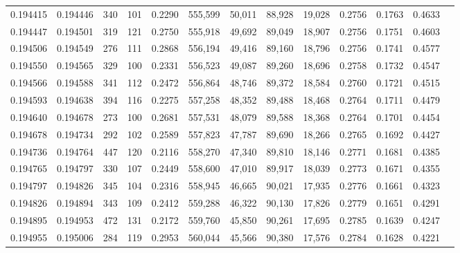 \begin{tabular}{rrrrrrrrrrrrr}
0.194415 & 0.194446 &   340 & 101 &                                     0.2290 & 555,599 &  50,011 &  88,928 &  19,028 & 0.2756 & 0.1763 & 0.4633 \\
0.194447 & 0.194501 &   319 & 121 &                                     0.2750 & 555,918 &  49,692 &  89,049 &  18,907 & 0.2756 & 0.1751 & 0.4603 \\
0.194506 & 0.194549 &   276 & 111 &                                     0.2868 & 556,194 &  49,416 &  89,160 &  18,796 & 0.2756 & 0.1741 & 0.4577 \\
0.194550 & 0.194565 &   329 & 100 &                                     0.2331 & 556,523 &  49,087 &  89,260 &  18,696 & 0.2758 & 0.1732 & 0.4547 \\
0.194566 & 0.194588 &   341 & 112 &                                     0.2472 & 556,864 &  48,746 &  89,372 &  18,584 & 0.2760 & 0.1721 & 0.4515 \\
0.194593 & 0.194638 &   394 & 116 &                                     0.2275 & 557,258 &  48,352 &  89,488 &  18,468 & 0.2764 & 0.1711 & 0.4479 \\
0.194640 & 0.194678 &   273 & 100 &                                     0.2681 & 557,531 &  48,079 &  89,588 &  18,368 & 0.2764 & 0.1701 & 0.4454 \\
0.194678 & 0.194734 &   292 & 102 &                                     0.2589 & 557,823 &  47,787 &  89,690 &  18,266 & 0.2765 & 0.1692 & 0.4427 \\
0.194736 & 0.194764 &   447 & 120 &                                     0.2116 & 558,270 &  47,340 &  89,810 &  18,146 & 0.2771 & 0.1681 & 0.4385 \\
0.194765 & 0.194797 &   330 & 107 &                                     0.2449 & 558,600 &  47,010 &  89,917 &  18,039 & 0.2773 & 0.1671 & 0.4355 \\
0.194797 & 0.194826 &   345 & 104 &                                     0.2316 & 558,945 &  46,665 &  90,021 &  17,935 & 0.2776 & 0.1661 & 0.4323 \\
0.194826 & 0.194894 &   343 & 109 &                                     0.2412 & 559,288 &  46,322 &  90,130 &  17,826 & 0.2779 & 0.1651 & 0.4291 \\
0.194895 & 0.194953 &   472 & 131 &                                     0.2172 & 559,760 &  45,850 &  90,261 &  17,695 & 0.2785 & 0.1639 & 0.4247 \\
0.194955 & 0.195006 &   284 & 119 &                                     0.2953 & 560,044 &  45,566 &  90,380 &  17,576 & 0.2784 & 0.1628 & 0.4221 \\

\end{tabular}
